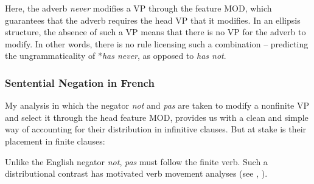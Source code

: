 \documentclass[output=paper]{langsci/langscibook}
\begin{document}
{\begin{exe}
\begin{xlist}
\begin{exe}
\begin{xlist}
\ea
{}
\z

Here, the adverb \emph{never} modifies a VP through the feature MOD,
which guarantees that the adverb requires the head VP that it
modifies. In an ellipsis structure, the absence of such a VP means
that there is no VP for the adverb to modify.  In other words, there
is no rule licensing such a combination -- predicting the
ungrammaticality of
*\emph{has never},  as opposed to \emph{has
not}.


\subsubsection{Sentential Negation in French}


My analysis in which the negator \emph{not} and \emph{pas} are taken
to modify a nonfinite VP and select it through the head feature
MOD, provides us with a clean and simple way of accounting for
their distribution in infinitive clauses. But at stake is
their placement in finite clauses:

\eal
{}
\zl

\eal
{}
\zl



\noindent
Unlike the English negator \emph{not}, \emph{pas} must follow the
finite verb. Such a distributional contrast has motivated verb
movement analyses (see \citet{Pollock:89}, \citet{Zanuttini:01}).


\end{xlist}
\end{exe}
\end{xlist}
\end{exe}}
\end{document}
